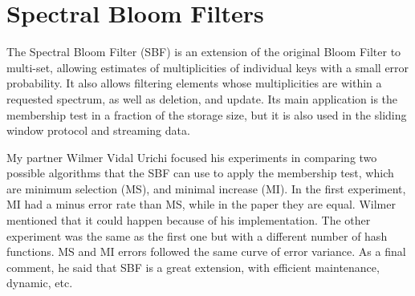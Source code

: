 \documentclass[a4paper, 10pt]{article}
\begin{document}




\section{Spectral Bloom Filters}

The Spectral Bloom Filter (SBF) is an extension of the original Bloom Filter to multi-set, allowing estimates of multiplicities of individual keys with a small error probability. It also allows filtering elements whose multiplicities are within a requested spectrum, as well as deletion, and update. Its main application is the membership test in a fraction of the storage size, but it is also used in the sliding window protocol and streaming data.

My partner Wilmer Vidal Urichi focused his experiments in comparing two possible algorithms that the SBF can use to apply the membership test, which are minimum selection (MS), and minimal increase (MI). In the first experiment, MI had a minus error rate than MS, while in the paper they are equal. Wilmer mentioned that it could happen because of his implementation. The other experiment was the same as the first one but with a different number of hash functions. MS and MI errors followed the same curve of error variance. As a final comment, he said that SBF is a great extension, with efficient maintenance, dynamic, etc.

\end{document}
